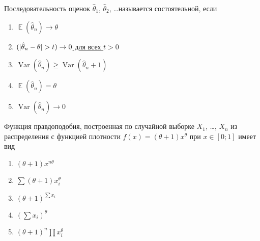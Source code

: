 \documentclass[t]{beamer}
\DeclareMathOperator{\Var}{Var}
\DeclareMathOperator{\E}{\mathbb{E}}
\let\P\relax
\DeclareMathOperator{\P}{\mathbb{P}}
\begin{document}
 \begin{frame} \label{39} 
\begin{block}{39} 

Последовательность оценок $\hat{\theta}_1$, $\hat{\theta}_2$, \ldots называется состоятельной, если
 


 \end{block} 
\begin{enumerate} 
\item[] \hyperlink{39-No}{\beamergotobutton{} $\E(\hat\theta_n)\to \theta$}
\item[] \hyperlink{39-Yes}{\beamergotobutton{} $\P(|\hat\theta_n - \theta |>t)\to 0$ для всех $t>0$}
\item[] \hyperlink{39-No}{\beamergotobutton{} $\Var(\hat\theta_n)\geq \Var(\hat\theta_n+1)$}
\item[] \hyperlink{39-No}{\beamergotobutton{} $\E(\hat\theta_n)=\theta$}
\item[] \hyperlink{39-No}{\beamergotobutton{} $\Var(\hat\theta_n)\to 0$}
\end{enumerate} 
\end{frame} 


 \begin{frame} \label{40} 
\begin{block}{40} 

Функция правдоподобия, построенная по случайной выборке $X_1$, \ldots, $X_n$ из распределения с функцией плотности $f(x)=(\theta+1)x^{\theta}$ при $x\in [0;1]$ имеет вид
 
 \end{block} 
\begin{enumerate} 
\item[] \hyperlink{40-No}{\beamergotobutton{} $(\theta+1)x^{n\theta}$}
\item[] \hyperlink{40-No}{\beamergotobutton{} $\sum (\theta+1)x_i^{\theta}$}
\item[] \hyperlink{40-No}{\beamergotobutton{} $(\theta+1)^{\sum x_i}$}
\item[] \hyperlink{40-No}{\beamergotobutton{} $(\sum x_i)^{\theta}$}
\item[] \hyperlink{40-Yes}{\beamergotobutton{} $(\theta+1)^n\prod x_i^{\theta}$}
\end{enumerate} 
\end{frame} 
\end{document}
